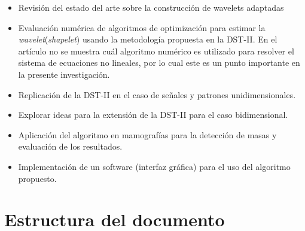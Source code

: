 \begin{itemize}
	\item Revisión del estado del arte sobre la construcción de wavelets adaptadas 
	\item Evaluación numérica de algoritmos de optimización para estimar la \textit{wavelet}(\textit{shapelet})
		usando la metodología propuesta en la DST-II. En el artículo \cite{Guido2018} no se muestra
		cuál algoritmo numérico es utilizado para resolver el sistema de ecuaciones no lineales, 
		por lo cual este es un punto importante en la presente investigación.
	\item Replicación de la DST-II en el caso de señales y patrones unidimensionales. 
	\item Explorar ideas para la extensión de la DST-II para el caso bidimensional. 
	\item Aplicación del algoritmo en mamografías para la detección de masas y evaluación de los resultados.  
	\item Implementación de un software (interfaz gráfica) para el uso del algoritmo propuesto.
\end{itemize}

\section{Estructura del documento}
